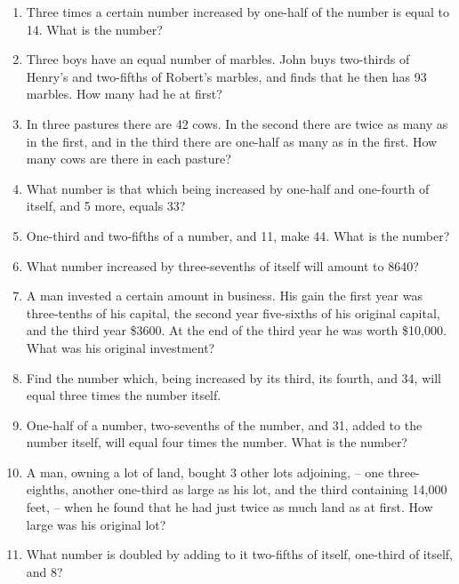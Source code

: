 \documentclass{book}
\begin{document}
\begin{enumerate}

\item Three times a certain number increased by one-half of the
number is equal to 14. What is the number?

\item Three boys have an equal number of marbles. John buys
two-thirds of Henry's and two-fifths of Robert's marbles, and
finds that he then has 93 marbles. How many had he at first?

\item In three pastures there are 42 cows. In the second there are
twice as many as in the first, and in the third there are one-half
as many as in the first. How many cows are there in each pasture?

\item What number is that which being increased by one-half and
one-fourth of itself, and 5 more, equals 33?

\item One-third and two-fifths of a number, and 11, make 44. What
is the number?

\item What number increased by three-sevenths of itself will
amount to 8640?

\item A man invested a certain amount in business. His gain the
first year was three-tenths of his capital, the second year
five-sixths of his original capital, and the third year \$3600. At
the end of the third year he was worth \$10,000. What was his
original investment?

\item Find the number which, being increased by its third, its
fourth, and 34, will equal three times the number itself.

\item One-half of a number, two-sevenths of the number, and 31,
added to the number itself, will equal four times the number. What
is the number?

\item A man, owning a lot of land, bought 3 other lots adjoining,
-- one three-eighths, another one-third as large as his lot, and
the third containing 14,000 feet, -- when he found that he had
just twice as much land as at first. How large was his original
lot?

\item What number is doubled by adding to it two-fifths of itself,
one-third of itself, and 8?


\end{enumerate}
\end{document}
